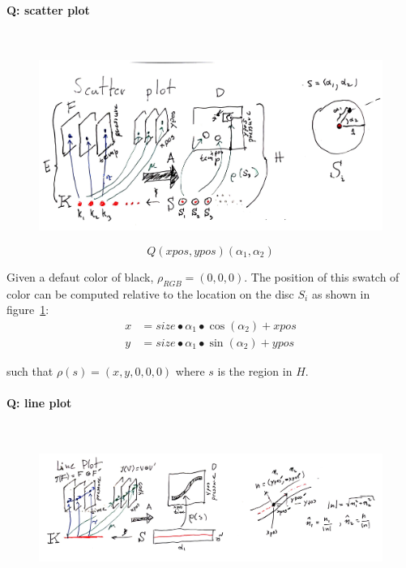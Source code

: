 \documentclass[../main.tex]{subfiles}
\begin{document}
\paragraph{Q: scatter plot}\mbox{} \\
\label{sec:artist_example_scatter}
\begin{figure}[H]
    \includegraphics[width=\textwidth]{figures/math/scatter.png}
    \label{fig:artist_scatter}
\end{figure}

\begin{equation}
Q(xpos, ypos)(\alpha_{1}, \alpha_{2}) 
\end{equation}

Given a defaut color of black, $\rho_{RGB} = (0,0,0)$. The position of this swatch of color can be computed relative to the location on the disc $S_{i}$ as shown in figure~\ref{fig:artist_scatter}:
\begin{align}
x &= size\bullet \alpha_1 \bullet \cos(\alpha_2) + xpos\\
y &= size\bullet \alpha_1 \bullet \sin(\alpha_2) + ypos
\end{align}

such that $\rho(s) = (x, y, 0, 0, 0)$ where $s$ is the region in $H$. 

\paragraph{Q: line plot}\mbox{} \\
\label{sec:artist_example_line}
\begin{figure}[H]
    \includegraphics[width=\textwidth]{figures/math/line.png}
    \label{fig:artist_line}
\end{figure}
\end{document}
